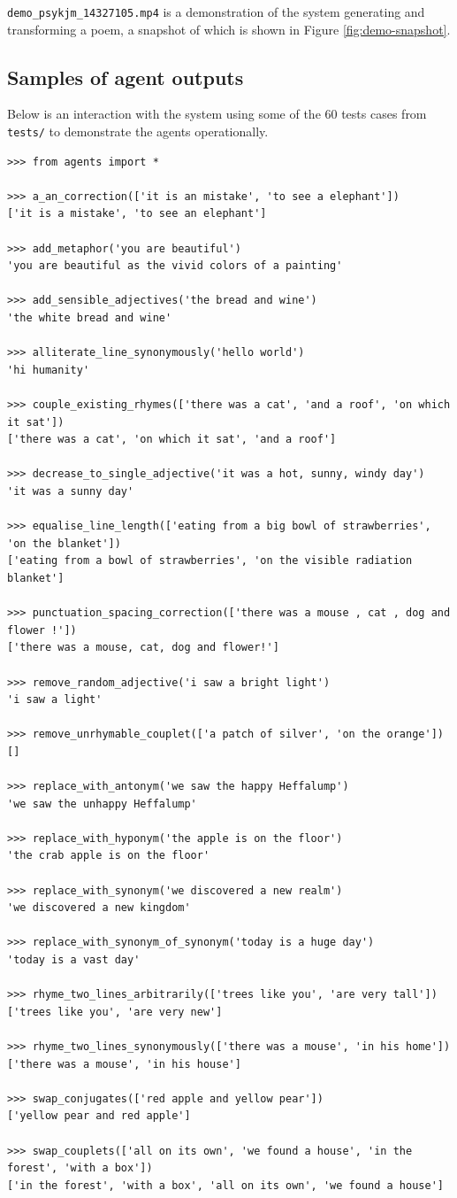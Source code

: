 \documentclass[a4paper,10pt]{article}
\begin{document}
\texttt{demo\_psykjm\_14327105.mp4} is a demonstration of the system generating and transforming a poem, a snapshot of which is shown in Figure \ref{fig:demo-snapshot}.

\subsection{Samples of agent outputs}
\label{ssec:samples-of-agent-outputs}
Below is an interaction with the system using some of the 60 tests cases from \texttt{tests/} to demonstrate the agents operationally.
\begin{verbatim}
>>> from agents import *

>>> a_an_correction(['it is an mistake', 'to see a elephant'])
['it is a mistake', 'to see an elephant']

>>> add_metaphor('you are beautiful')
'you are beautiful as the vivid colors of a painting'

>>> add_sensible_adjectives('the bread and wine')
'the white bread and wine'

>>> alliterate_line_synonymously('hello world')
'hi humanity'

>>> couple_existing_rhymes(['there was a cat', 'and a roof', 'on which it sat'])
['there was a cat', 'on which it sat', 'and a roof']

>>> decrease_to_single_adjective('it was a hot, sunny, windy day')
'it was a sunny day'

>>> equalise_line_length(['eating from a big bowl of strawberries', 'on the blanket'])
['eating from a bowl of strawberries', 'on the visible radiation blanket']

>>> punctuation_spacing_correction(['there was a mouse , cat , dog and flower !'])
['there was a mouse, cat, dog and flower!']

>>> remove_random_adjective('i saw a bright light')
'i saw a light'

>>> remove_unrhymable_couplet(['a patch of silver', 'on the orange'])
[]

>>> replace_with_antonym('we saw the happy Heffalump')
'we saw the unhappy Heffalump'

>>> replace_with_hyponym('the apple is on the floor')
'the crab apple is on the floor'

>>> replace_with_synonym('we discovered a new realm')
'we discovered a new kingdom'

>>> replace_with_synonym_of_synonym('today is a huge day')
'today is a vast day'

>>> rhyme_two_lines_arbitrarily(['trees like you', 'are very tall'])
['trees like you', 'are very new']

>>> rhyme_two_lines_synonymously(['there was a mouse', 'in his home'])
['there was a mouse', 'in his house']

>>> swap_conjugates(['red apple and yellow pear'])
['yellow pear and red apple']

>>> swap_couplets(['all on its own', 'we found a house', 'in the forest', 'with a box'])
['in the forest', 'with a box', 'all on its own', 'we found a house']

\end{verbatim}



\end{document}
